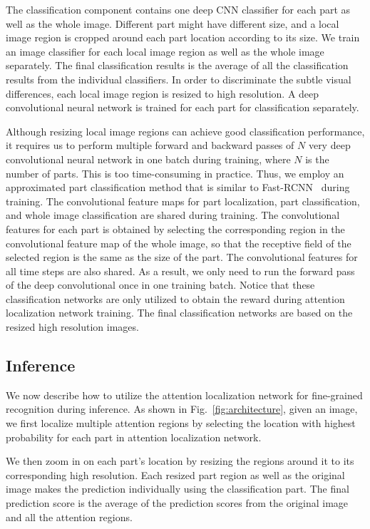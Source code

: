 \documentclass[runningheads]{llncs}
\begin{document}
The classification component contains one deep CNN classifier for each part as well as the whole image.
Different part might have different size, and a local image region is cropped around each part location according to its size.
We train an image classifier for each local image region as well as the whole image separately.
The final classification results is the average of all the classification results from the individual classifiers.
In order to discriminate the subtle visual differences, each local image region is resized to high resolution.
A  deep convolutional neural network is trained for each part for classification separately.


Although resizing local image regions can achieve good classification performance, it requires us to perform multiple forward and backward passes of $N$ very deep convolutional neural network in one batch during training, where $N$ is the number of parts. This is too time-consuming in practice.
Thus, we employ an approximated part classification method that is similar to Fast-RCNN~\cite{girshick2015fast} during training.
The convolutional feature maps for part localization, part classification, and whole image classification are shared during training.
The convolutional features for each part is obtained by selecting the corresponding region in the convolutional feature map of the whole image, so that the receptive field of the selected region is the same as the size of the part.
The convolutional features for all time steps are also shared.
As a result, we only need to run the forward pass of the deep convolutional once in one training batch.
Notice that these classification networks are only utilized to obtain the reward during attention localization network training.
The final classification networks are based on the resized high resolution images.

\subsection{Inference}
We now describe how to utilize the attention localization network for fine-grained recognition during inference.
As shown in Fig.~\ref{fig:architecture}, given an image, we first localize multiple attention regions by selecting the location with highest probability for each part in attention localization network.

We then zoom in on each part's location by resizing the regions around it to its corresponding high resolution.
Each resized part region as well as the original image makes the prediction individually using the classification part.
The final prediction score is the average of the prediction scores from the original image and all the attention regions.
\end{document}
